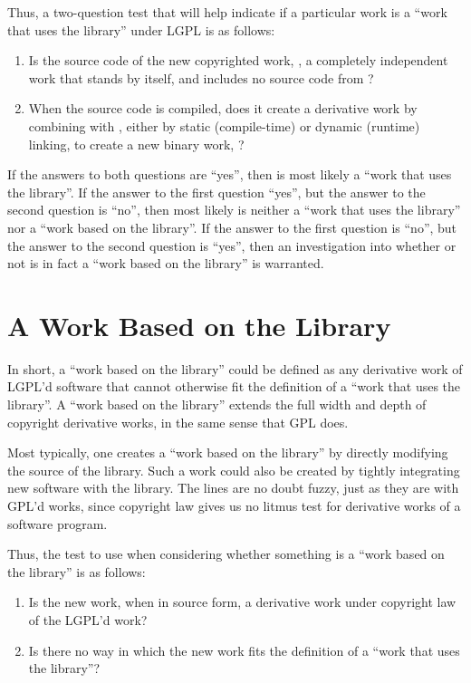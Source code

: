 \documentclass[12pt]{report}
\begin{document}
Thus, a two-question test that will help indicate if a particular work is
a ``work that uses the library'' under LGPL is as follows:

\begin{enumerate}

\item Is the source code of the new copyrighted work, \worki{}, a
  completely independent work that stands by itself, and includes no
  source code from \workl{}?

\item When the source code is compiled, does it create a derivative work
  by combining with \workl{}, either by static (compile-time) or dynamic
  (runtime) linking, to create a new binary work, \lplusi{}?
\end{enumerate}

If the answers to both questions are ``yes'', then \worki{} is most likely
a ``work that uses the library''.  If the answer to the first question
``yes'', but the answer to the second question is ``no'', then most likely
\worki{} is neither a ``work that uses the library'' nor a ``work based on
the library''.  If the answer to the first question is ``no'', but the
answer to the second question is ``yes'', then an investigation into
whether or not \worki{} is in fact a ``work based on the library'' is
warranted.

\section{A Work Based on the Library}

In short, a ``work based on the library'' could be defined as any
derivative work of LGPL'd software that cannot otherwise fit the
definition of a ``work that uses the library''.  A ``work based on the
library'' extends the full width and depth of copyright derivative works,
in the same sense that GPL does.

Most typically, one creates a ``work based on the library'' by directly
modifying the source of the library.  Such a work could also be created by
tightly integrating new software with the library.  The lines are no doubt
fuzzy, just as they are with GPL'd works, since copyright law gives us no
litmus test for derivative works of a software program.

Thus, the test to use when considering whether something is a ``work
based on the library'' is as follows:

\begin{enumerate}

\item Is the new work, when in source form, a derivative work under
  copyright law of the LGPL'd work?

\item Is there no way in which the new work fits the definition of a
  ``work that uses the library''?
\end{enumerate}
\end{document}
